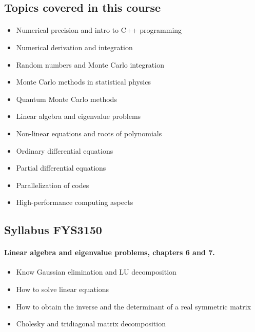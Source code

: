 \documentclass[%
oneside,                 %
final,                   %
10pt]{article}
\begin{document}
\noindent



\subsection*{Topics covered in this course}


\paragraph{}
\begin{itemize}
  \item Numerical precision and intro to C++ programming

  \item Numerical derivation and integration

  \item Random numbers and Monte Carlo integration

  \item Monte Carlo methods in statistical physics

  \item Quantum Monte Carlo methods

  \item Linear algebra and eigenvalue problems

  \item Non-linear equations and roots of polynomials

  \item Ordinary differential equations

  \item Partial differential equations

  \item Parallelization of codes

  \item High-performance computing aspects
\end{itemize}

\noindent




\subsection*{Syllabus FYS3150}


\paragraph{Linear algebra and eigenvalue problems, chapters 6 and 7.}
\begin{itemize}
  \item Know Gaussian elimination and LU decomposition

  \item How to solve linear equations

  \item How to obtain the inverse and the determinant of a real symmetric matrix

  \item Cholesky and tridiagonal matrix decomposition
\end{itemize}
\end{document}

